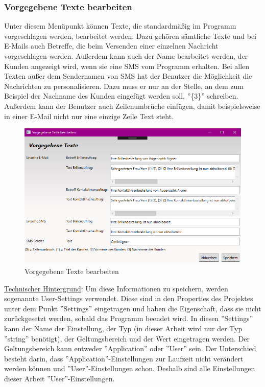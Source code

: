 \subsubsection{Vorgegebene Texte bearbeiten}
Unter diesem Menüpunkt können Texte, die standardmäßig im Programm vorgeschlagen werden, bearbeitet werden. Dazu gehören sämtliche Texte und bei E-Mails auch Betreffe, die beim Versenden einer einzelnen Nachricht vorgeschlagen werden. Außerdem kann auch der Name bearbeitet werden, der Kunden angezeigt wird, wenn sie eine SMS vom Programm erhalten. \newline Bei allen Texten außer dem Sendernamen von SMS hat der Benutzer die Möglichkeit die Nachrichten zu personalisieren. Dazu muss er nur an der Stelle, an dem zum Beispiel der Nachname des Kunden eingefügt werden soll, ''\{3\}'' schreiben. Außerdem kann der Benutzer auch Zeilenumbrüche einfügen, damit beispielsweise in einer E-Mail nicht nur eine einzige Zeile Text steht.
\begin{figure}[H]
\begin{center}
	\includegraphics[scale=0.7]{images/VorgegebeneTexteBearbeiten.png}
\end{center}
	\caption{Vorgegebene Texte bearbeiten}
	\label{fig:sample}
\end{figure} 
\noindent \underline{Technischer Hintergrund}: \linebreak Um diese Informationen zu speichern, werden sogenannte User-Settings verwendet. Diese sind in den Properties des Projektes unter dem Punkt ''Settings'' eingetragen und haben die Eigenschaft, dass sie nicht zurückgesetzt werden, sobald das Programm beendet wird. In diesen ''Settings'' kann der Name der Einstellung, der Typ (in dieser Arbeit wird nur der Typ ''string'' benötigt), der Geltungsbereich und der Wert  eingetragen werden. Der Geltungsbereich kann entweder ''Application'' oder ''User'' sein. Der Unterschied besteht darin, dass ''Application''-Einstellungen zur Laufzeit nicht verändert werden können und ''User''-Einstellungen schon. Deshalb sind alle Einstellungen dieser Arbeit ''User''-Einstellungen.
